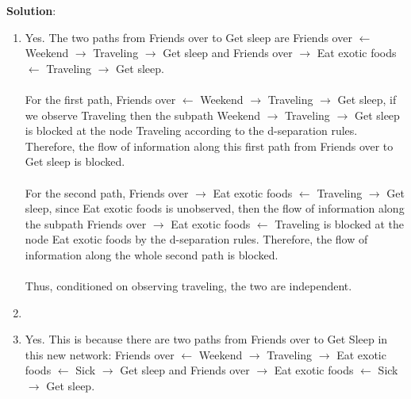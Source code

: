 \documentclass[submit]{../harvardml}
\newcommand{\attr}[1]{\textsf{#1}}
\newenvironment{solution}{
    \vspace{2mm}
    \color{blue}\noindent\textbf{Solution}:
}{}
\begin{document}
\begin{solution}
\begin{enumerate}
    \item Yes. The two paths from Friends over to Get sleep are Friends over $\leftarrow$ Weekend $\rightarrow$ Traveling $\rightarrow$ Get sleep and Friends over $\rightarrow$ Eat exotic foods $\leftarrow$ Traveling $\rightarrow$ Get sleep. 
    \\
    \\
    For the first path, Friends over $\leftarrow$ Weekend $\rightarrow$ Traveling $\rightarrow$ Get sleep, if we observe Traveling then the subpath Weekend $\rightarrow$ Traveling $\rightarrow$ Get sleep is blocked at the node Traveling according to the d-separation rules. Therefore, the flow of information along this first path from Friends over to Get sleep is blocked. 
    \\
    \\
    For the second path, Friends over $\rightarrow$ Eat exotic foods $\leftarrow$ Traveling $\rightarrow$ Get sleep, since Eat exotic foods is unobserved, then the flow of information along the subpath Friends over $\rightarrow$ Eat exotic foods $\leftarrow$ Traveling is blocked at the node Eat exotic foods by the d-separation rules. Therefore, the flow of information along the whole second path is blocked. 
    \\
    \\
    Thus, conditioned on observing traveling, the two are independent.
    \item 
    \noindent
    \begin{center}
  \end{center}
  \item Yes. This is because there are two paths from Friends over to Get Sleep in this new network: Friends over $\leftarrow$ Weekend $\rightarrow$ Traveling $\rightarrow$ Eat exotic foods $\leftarrow$ Sick $\rightarrow$ Get sleep and Friends over $\rightarrow$ Eat exotic foods $\leftarrow$ Sick $\rightarrow$ Get sleep. 

\end{enumerate}
\end{solution}
\end{document}
